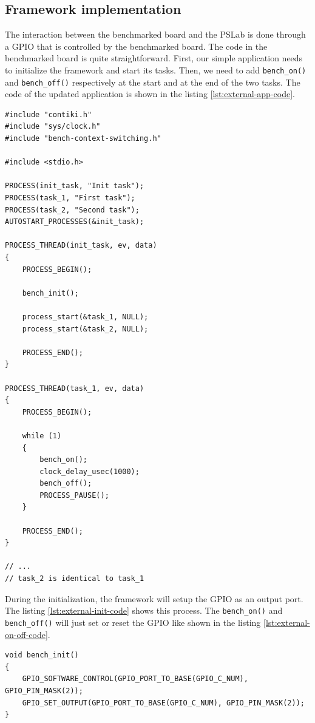 \subsection{Framework implementation}

The interaction between the benchmarked board and the PSLab is done through a GPIO that is controlled by the benchmarked board.
The code in the benchmarked board is quite straightforward.
First, our simple application needs to initialize the framework and start its tasks.
Then, we need to add \texttt{bench\_on()} and \texttt{bench\_off()} respectively at the start and at the end of the two tasks.
The code of the updated application is shown in the listing \ref{lst:external-app-code}.

\begin{lstlisting}[style=CStyle, float, caption={source code of the simple application in Contiki}, label={lst:external-app-code}]
#include "contiki.h"
#include "sys/clock.h"
#include "bench-context-switching.h"

#include <stdio.h>

PROCESS(init_task, "Init task");
PROCESS(task_1, "First task");
PROCESS(task_2, "Second task");
AUTOSTART_PROCESSES(&init_task);

PROCESS_THREAD(init_task, ev, data)
{
    PROCESS_BEGIN();

    bench_init();

    process_start(&task_1, NULL);
    process_start(&task_2, NULL);

    PROCESS_END();
}

PROCESS_THREAD(task_1, ev, data)
{
    PROCESS_BEGIN();

    while (1)
    {
        bench_on();
        clock_delay_usec(1000);
        bench_off();
        PROCESS_PAUSE();
    }

    PROCESS_END();
}

// ...
// task_2 is identical to task_1
\end{lstlisting}

During the initialization, the framework will setup the GPIO as an output port. 
The listing \ref{lst:external-init-code} shows this process.
The \texttt{bench\_on()} and \texttt{bench\_off()} will just set or reset the GPIO like shown in the listing \ref{lst:external-on-off-code}.

\begin{lstlisting}[style=CStyle, caption={initialization of the framework in Contiki}, label={lst:external-init-code}]
void bench_init()
{
    GPIO_SOFTWARE_CONTROL(GPIO_PORT_TO_BASE(GPIO_C_NUM), GPIO_PIN_MASK(2));
    GPIO_SET_OUTPUT(GPIO_PORT_TO_BASE(GPIO_C_NUM), GPIO_PIN_MASK(2));
}
\end{lstlisting}

